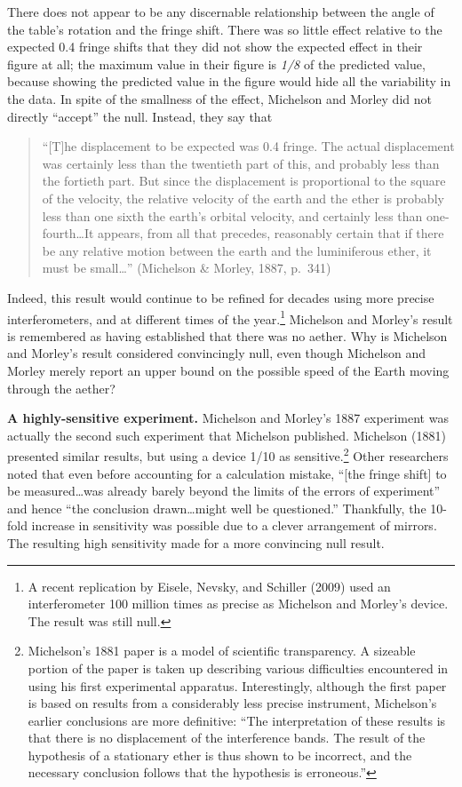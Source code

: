 \documentclass[english,floatsintext,man]{apa6}
\theoremstyle{definition}
\theoremstyle{definition}
\theoremstyle{definition}
\theoremstyle{remark}
\begin{document}
There does not appear to be any discernable relationship between the
angle of the table's rotation and the fringe shift. There was so little
effect relative to the expected 0.4 fringe shifts that they did not show
the expected effect in their figure at all; the maximum value in their
figure is \emph{1/8} of the predicted value, because showing the
predicted value in the figure would hide all the variability in the
data. In spite of the smallness of the effect, Michelson and Morley did
not directly \enquote{accept} the null. Instead, they say that

\begin{quote}
\enquote{{[}T{]}he displacement to be expected was 0.4 fringe. The
actual displacement was certainly less than the twentieth part of this,
and probably less than the fortieth part. But since the displacement is
proportional to the square of the velocity, the relative velocity of the
earth and the ether is probably less than one sixth the earth's orbital
velocity, and certainly less than one-fourth\ldots{}It appears, from all
that precedes, reasonably certain that if there be any relative motion
between the earth and the luminiferous ether, it must be small\ldots{}}
(Michelson \& Morley, 1887, p.~341)
\end{quote}

Indeed, this result would continue to be refined for decades using more
precise interferometers, and at different times of the year.\footnote{A
  recent replication by Eisele, Nevsky, and Schiller (2009) used an
  interferometer 100 million times as precise as Michelson and Morley's
  device. The result was still null.} Michelson and Morley's result is
remembered as having established that there was no aether. Why is
Michelson and Morley's result considered convincingly null, even though
Michelson and Morley merely report an upper bound on the possible speed
of the Earth moving through the aether?

\textbf{A highly-sensitive experiment.} Michelson and Morley's 1887
experiment was actually the second such experiment that Michelson
published. Michelson (1881) presented similar results, but using a
device 1/10 as sensitive.\footnote{Michelson's 1881 paper is a model of
  scientific transparency. A sizeable portion of the paper is taken up
  describing various difficulties encountered in using his first
  experimental apparatus. Interestingly, although the first paper is
  based on results from a considerably less precise instrument,
  Michelson's earlier conclusions are more definitive: \enquote{The
  interpretation of these results is that there is no displacement of
  the interference bands. The result of the hypothesis of a stationary
  ether is thus shown to be incorrect, and the necessary conclusion
  follows that the hypothesis is erroneous.}} Other researchers noted
that even before accounting for a calculation mistake, \enquote{{[}the
fringe shift{]} to be measured\ldots{}was already barely beyond the
limits of the errors of experiment} and hence \enquote{the conclusion
drawn\ldots{}might well be questioned.} Thankfully, the 10-fold increase
in sensitivity was possible due to a clever arrangement of mirrors. The
resulting high sensitivity made for a more convincing null result.
\end{document}
